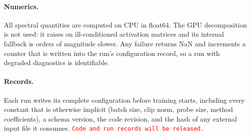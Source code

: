 \documentclass[anon]{opt2026}     %
\newcommand{\PH}[1]{\textcolor{red}{\texttt{#1}}}   %
\begin{document}
\paragraph{Numerics.} All spectral quantities are computed on CPU in float64.
The GPU decomposition is not used: it raises on ill-conditioned activation
matrices and its internal fallback is orders of magnitude slower. Any failure
returns NaN and increments a counter that is written into the run's
configuration record, so a run with degraded diagnostics is identifiable.

\paragraph{Records.} Each run writes its complete configuration before training
starts, including every constant that is otherwise implicit (batch size, clip
norm, probe size, method coefficients), a schema version, the code revision, and
the hash of any external input file it consumes. \PH{Code and run records will be
released.}
\end{document}
